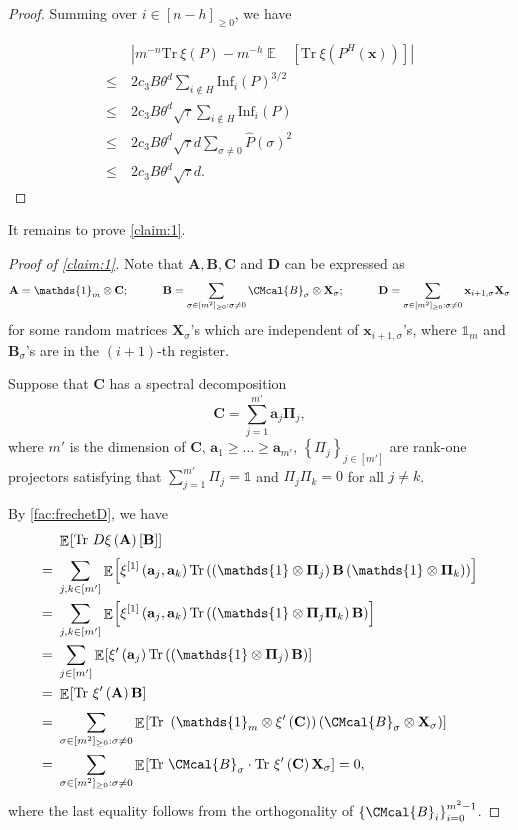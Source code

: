 \documentclass[10pt,a4paper]{article}
\def\B{\CMcal{B}}
\theoremstyle{plain}
\theoremstyle{definition}
\newcommand {\minusspace} {\: \! \!}
\newcommand {\Fn} [2] {\ensuremath{ #1 \minusspace \Br{ #2 } }}
\newcommand {\set} [1] {\ensuremath{ \left\lbrace #1 \right\rbrace }}
\newcommand {\br} [1] {\ensuremath{ \left( #1 \right) }}
\newcommand {\Br} [1] {\ensuremath{ \left[ #1 \right] }}
\newcommand {\ab} [1] {\ensuremath{ \left| #1 \right| }}
\DeclareMathOperator*{\bigE}{\mathbb{E}}
\newcommand {\expec} [2] {\Fn{\bigE_{\substack{#1}}}{#2}}
\newcommand {\Tr} {\ensuremath{ \mathrm{Tr} }}
\newcommand {\id} {\ensuremath{\mathds{1}}}
\newcommand{\randx}{\ensuremath{\mathbf{x}}}
\newcommand{\randA}{\ensuremath{\mathbf{A}}}
\newcommand{\randB}{\ensuremath{\mathbf{B}}}
\newcommand{\randC}{\ensuremath{\mathbf{C}}}
\newcommand{\randD}{\ensuremath{\mathbf{D}}}
\newcommand{\randa}{\ensuremath{\mathbf{a}}}
\newcommand{\randPi}{\ensuremath{\mathbf{\Pi}}}
\newcommand{\1}{\mathbb{1}} %
\begin{document}
\begin{proof}
	Summing over $i\in[n-h]_{\geq0}$, we have 
	
	\begin{align*}
&\ab{m^{-n}\Tr~\xi\br{P}-m^{-h}\expec{}{\Tr~\xi\br{P^H(\randx)}}}\\
\leq~&2c_3 B \theta^d\sum_{i\notin H}\mathrm{Inf}_{i}\br{P}^{3/2}\\
\leq~&2c_3 B \theta^d\sqrt{\tau}\sum_{i\notin H}\mathrm{Inf}_{i}\br{P}\\
\leq~&2c_3 B \theta^d\sqrt{\tau}d\sum_{\sigma\ne0}\widehat{P}\br{\sigma}^2\\
\leq~&2c_3 B \theta^d\sqrt{\tau}d.
\end{align*}

\end{proof}
It remains to prove \cref{claim:1}.
\begin{proof}[Proof of \cref{claim:1}]
Note that $\mathbf{A},\mathbf{B},\mathbf{C}$ and $\randD$ can be expressed as
	\begin{align*}
	  \mathbf{A} =\id_m\otimes\mathbf{C}; \quad\quad\quad 
	  \mathbf{B} =\sum_{\sigma\in[m^2]_{\geq 0}:\sigma\neq 0}\B_{\sigma}\otimes\mathbf{X}_{\sigma}; \quad\quad\quad
	  \mathbf{D} = \sum_{\sigma\in[m^2]_{\geq 0}:\sigma\neq 0}\randx_{i+1,\sigma}\mathbf{X}_{\sigma}
	\end{align*}
for some random matrices $\mathbf{X}_{\sigma}$'s which are independent of $\randx_{i+1,\sigma}$'s, where $\id_m$ and $\mathbf{B}_{\sigma}$'s are in the $\br{i+1}$-th register.

Suppose that $\randC$ has a spectral decomposition
\begin{equation*}
\randC=\sum_{j=1}^{m'}\randa_j\randPi_j,
\end{equation*}
where $m'$ is the dimension of $\randC$, $\randa_1\geq\dots\geq\randa_{m'}$, $\set{\Pi_j}_{j\in[m']}$ are rank-one projectors satisfying that $\sum_{j=1}^{m'}\Pi_j=\id$ and $\Pi_j\Pi_k=0$ for all $j\ne k$.

By \cref{fac:frechetD}, we have 
\begin{align*}
&\expec{}{\Tr~D\xi\br{\mathbf{A}}\Br{\mathbf{B}}}\\
=~&\sum_{j,k\in[m']}\expec{}{\xi^{[1]}\br{\randa_j,\randa_k}\Tr\br{\br{\id\otimes\randPi_{j}}\randB\br{\id\otimes\randPi_{k}}}}\\
=~&\sum_{j,k\in[m']}\expec{}{\xi^{[1]}\br{\randa_j,\randa_k}\Tr\br{\br{\id\otimes\randPi_{j}\randPi_k}\randB}}\\
=~&\sum_{j\in[m']}\expec{}{\xi'\br{\randa_j}\Tr\br{\br{\id\otimes\randPi_{j}}\randB}}\\
=~&\expec{}{\Tr~\xi'\br{\randA}\randB}\\
=~&\sum_{\sigma\in[m^2]_{\geq 0}:\sigma\neq 0}\expec{}{\Tr~\br{\id_m\otimes\xi'\br{\randC}}\br{\B_{\sigma}\otimes\mathbf{X}_{\sigma}}}\\
=~&\sum_{\sigma\in[m^2]_{\geq 0}:\sigma\neq 0}\expec{}{\Tr~\B_{\sigma}\cdot\Tr~\xi'\br{\randC}\mathbf{X}_{\sigma}}=0,
\end{align*}
where the last equality follows from the orthogonality of $\set{\B_i}_{i=0}^{m^2-1}$.


\end{proof}
\end{document}
